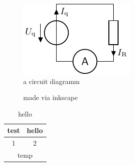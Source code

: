 \documentclass[twoside,f1]{HsH-report}
\begin{document}
	\begin{figure}
		\centering
		\includegraphics{crc/exampleCircuit.pdf}
		\caption{a circuit diagramm}
	\end{figure}

	\makeatletter

	\begin{figure}
		\graphicspath{{svg/}} %
		
		\caption{made via inkscape}
	\end{figure}

	\begin{table}
		\caption{hello}
		\begin{tabular}{c|c}
			test & hello \\\hline\hline
			1 & 2 \\
			\multicolumn{2}{|c|}{temp}
		\end{tabular}
	\end{table}

\printbibliography
\listoffigures
\end{document}
